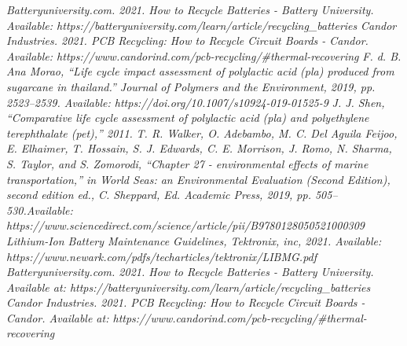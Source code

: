  \begin{thebibliography}{9}
        
		\textit{Batteryuniversity.com. 2021. How to Recycle Batteries - Battery University. Available: https://batteryuniversity.com/learn/article/recycling\_batteries}
		\textit{Candor Industries. 2021. PCB Recycling: How to Recycle Circuit Boards - Candor. Available: https://www.candorind.com/pcb-recycling/\#thermal-recovering}
        \textit{F. d. B. Ana Morao, “Life cycle impact assessment of polylactic acid (pla) produced from sugarcane in thailand.” Journal of Polymers and the Environment, 2019, pp. 2523–2539. Available: https://doi.org/10.1007/s10924-019-01525-9}
        \textit{ J. J. Shen, “Comparative life cycle assessment of polylactic acid (pla) and polyethylene terephthalate (pet),” 2011.}
        \textit{T. R. Walker, O. Adebambo, M. C. Del Aguila Feijoo, E. Elhaimer, T. Hossain, S. J. Edwards, C. E. Morrison, J. Romo, N. Sharma, S. Taylor, and S. Zomorodi, “Chapter 27 - environmental effects of marine transportation,” in World Seas: an Environmental
Evaluation (Second Edition), second edition ed., C. Sheppard, Ed. Academic Press, 2019, pp.
505–530.Available: https://www.sciencedirect.com/science/article/pii/B9780128050521000309}
        \textit{Lithium-Ion Battery Maintenance Guidelines, Tektronix, inc, 2021. Available: https://www.newark.com/pdfs/techarticles/tektronix/LIBMG.pdf }
        \textit{Batteryuniversity.com. 2021. How to Recycle Batteries - Battery University. Available at: https://batteryuniversity.com/learn/article/recycling\_batteries } 
        \textit{Candor Industries. 2021. PCB Recycling: How to Recycle Circuit Boards - Candor. Available at: https://www.candorind.com/pcb-recycling/\#thermal-recovering}
				
		


		


		

    \end{thebibliography}